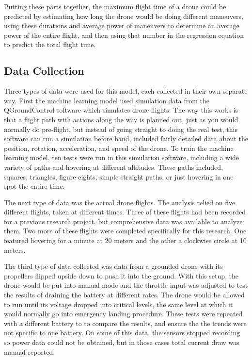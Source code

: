 \documentclass{article}
\begin{document}
Putting these parts together, the maximum flight time of a drone could be predicted by estimating how long the drone would be doing different maneuvers, using these durations and average power of maneuvers to determine an average power of the entire flight, and then using that number in the regression equation to predict the total flight time.


\subsection{Data Collection}

Three types of data were used for this model, each collected in their own separate way. First the machine learning model used simulation data from the QGroundControl software which simulates drone flights. The way this works is that a flight path with actions along the way is planned out, just as you would normally do pre-flight, but instead of going straight to doing the real test, this software can run a simulation before hand, included fairly detailed data about the position, rotation, acceleration, and speed of the drone. To train the machine learning model, ten tests were run in this simulation software, including a wide variety of paths and hovering at different altitudes. These paths included, squares, triangles, figure eights, simple straight paths, or just hovering in one spot the entire time. \par


The next type of data was the actual drone flights. The analysis relied on five different flights, taken at different times. Three of these flights had been recorded for a previous research project, but comprehensive data was available to analyze them. Two more of these flights were completed specifically for this research. One featured hovering for a minute at 20 meters and the other a clockwise circle at 10 meters.\par

The third type of data collected was data from a grounded drone with its propellers flipped upside down to push it into the ground. With this setup, the drone would be put into manual mode and the throttle input was adjusted to test the results of draining the battery at different rates. The drone would be allowed to run until its voltage dropped into critical levels, the same level at which it would normally go into emergency landing procedure. These tests were repeated with a different battery to to compare the results, and ensure the the trends were not specific to one battery. On some of this data, the sensors stopped recording so power data could not be obtained, but in those cases total current draw was manual reported.
\end{document}
